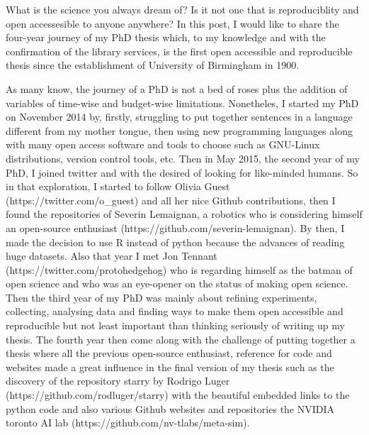 \documentclass[11pt]{article}
\begin{document}
What is the science you always dream of? Is it not one that is
reproduciblity and open accessesible to anyone anywhere?
In this post, I would like to share the four-year journey
of my PhD thesis which, to my knowledge and with the confirmation of the library services,
is the first open accessible and reproducible thesis
since the establishment of University of Birmingham in 1900.

As many know, the journey of a PhD is not a bed of roses
plus the addition of variables of time-wise and budget-wise limitations.
Nonetheles,
I started my PhD on November 2014
by, firstly, struggling to put together sentences in a language
different from my mother tongue, then using new programming 
languages along with many open access software and tools to choose 
such as GNU-Linux distributions, version control tools, etc. 
Then in May 2015, the second year of my PhD, I joined twitter and
with the desired of looking for like-minded humans. So in that
exploration, I started to follow 
Olivia Guest (https://twitter.com/o\_guest) and all her nice Github contributions, 
then I found the repositories of 
Severin Lemaignan, a robotics who is considering himself
an open-source enthusiast (https://github.com/severin-lemaignan). 
By then, I made the decision to use R instead of python because 
the advances of reading huge datasets. Also that year I met 
Jon Tennant (https://twitter.com/protohedgehog) 
who is regarding himself as the batman of open science
and who was an eye-opener on the status of making open 
science.
Then the third year of my PhD was mainly about refining experiments, 
collecting, analysing data and finding ways to make them open accessible 
and reproducible but not least important than thinking seriously 
of writing up my thesis. 
The fourth year then come along with the challenge of 
putting together a thesis where 
all the previous open-source enthusiast, reference for code and websites 
made a great influence in the final version of my thesis such as 
the discovery of the repository starry 
by Rodrigo Luger (https://github.com/rodluger/starry)
with the beautiful embedded links to the python code
and also various Github websites and repositories the NVIDIA toronto AI lab
(https://github.com/nv-tlabs/meta-sim).



\end{document}
